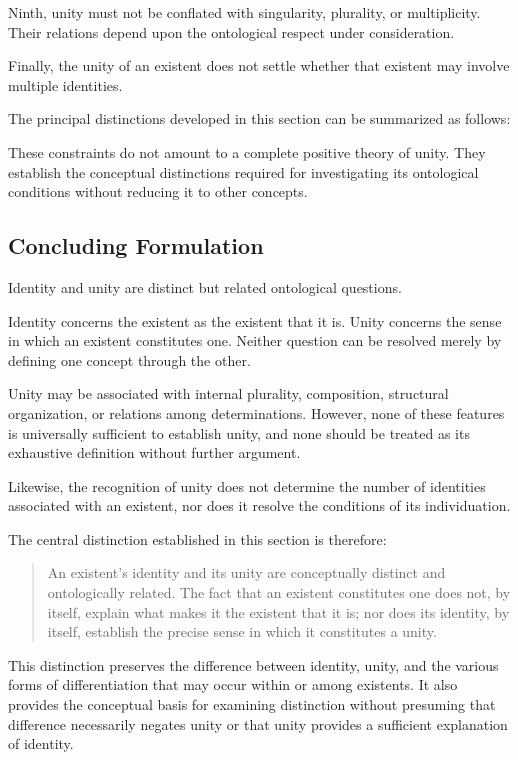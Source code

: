 Ninth, unity must not be conflated
with singularity, plurality, or
multiplicity. Their relations
depend upon the ontological
respect under consideration.

Finally, the unity of an existent
does not settle whether that
existent may involve multiple
identities.

The principal distinctions developed
in this section can be summarized
as follows:



These constraints do not amount
to a complete positive theory
of unity. They establish the
conceptual distinctions required
for investigating its ontological
conditions without reducing it
to other concepts.

\subsection{Concluding Formulation}

Identity and unity are distinct
but related ontological questions.

Identity concerns the existent
as the existent that it is. Unity
concerns the sense in which an
existent constitutes one. Neither
question can be resolved merely
by defining one concept through
the other.

Unity may be associated with
internal plurality, composition,
structural organization, or
relations among determinations.
However, none of these features
is universally sufficient to
establish unity, and none should
be treated as its exhaustive
definition without further
argument.

Likewise, the recognition of
unity does not determine the
number of identities associated
with an existent, nor does it
resolve the conditions of its
individuation.

The central distinction established
in this section is therefore:

\begin{quote}
An existent's identity and its
unity are conceptually distinct
and ontologically related. The
fact that an existent constitutes
one does not, by itself, explain
what makes it the existent that
it is; nor does its identity,
by itself, establish the precise
sense in which it constitutes
a unity.
\end{quote}

This distinction preserves the
difference between identity,
unity, and the various forms
of differentiation that may
occur within or among existents.
It also provides the conceptual
basis for examining distinction
without presuming that difference
necessarily negates unity or
that unity provides a sufficient
explanation of identity.